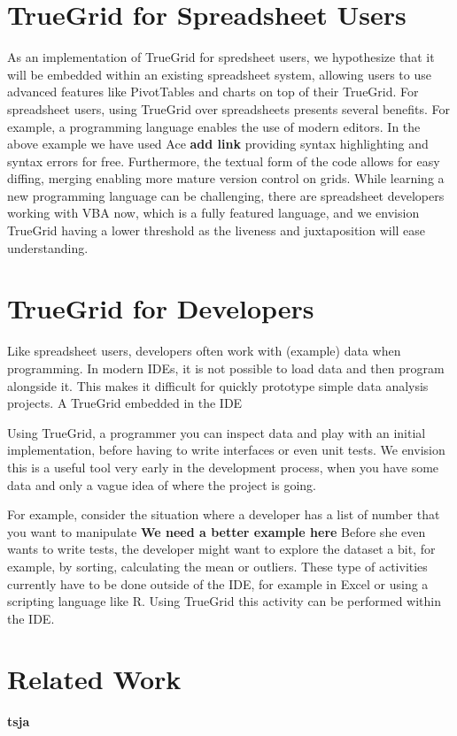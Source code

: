 \documentclass{llncs}
\newcommand{\todo}[1]{\textbf{#1}}
\begin{document}
\section{TrueGrid for Spreadsheet Users}
As an implementation of TrueGrid for spredsheet users, we hypothesize that it will be embedded within an existing spreadsheet system, allowing users to use advanced features like PivotTables and charts on top of their TrueGrid. For spreadsheet users, using TrueGrid over spreadsheets presents several benefits. For example, a programming language enables the use of modern editors. In the above example we have used Ace \todo{add link} providing syntax highlighting and syntax errors for free. Furthermore, the textual form of the code allows for easy diffing, merging enabling more mature version control on grids. While learning a new programming language can be challenging, there are spreadsheet developers working with VBA now, which is a fully featured language, and we envision TrueGrid having a lower threshold as the liveness and juxtaposition will ease understanding.

\section{TrueGrid for Developers}
Like spreadsheet users, developers often work with (example) data when programming. In modern IDEs, it is not possible to load data and then program alongside it. This makes it difficult for quickly prototype simple data analysis projects. A TrueGrid embedded in the IDE


Using TrueGrid, a programmer you can inspect data and play with an initial implementation, before having to write interfaces or even unit tests. We envision this is a useful tool very early in the development process, when you have some data and only a vague idea of where the project is going. 

For example, consider the situation where a developer has a list of number that you want to manipulate \todo{We need a better example here} Before she even wants to write tests, the developer might want to explore the dataset a bit, for example, by sorting, calculating the mean or outliers. These type of activities currently have to be done outside of the IDE, for example in Excel or using a scripting language like R. Using TrueGrid this activity can be performed within the IDE.


\section{Related Work}
\todo{tsja}



\end{document}
